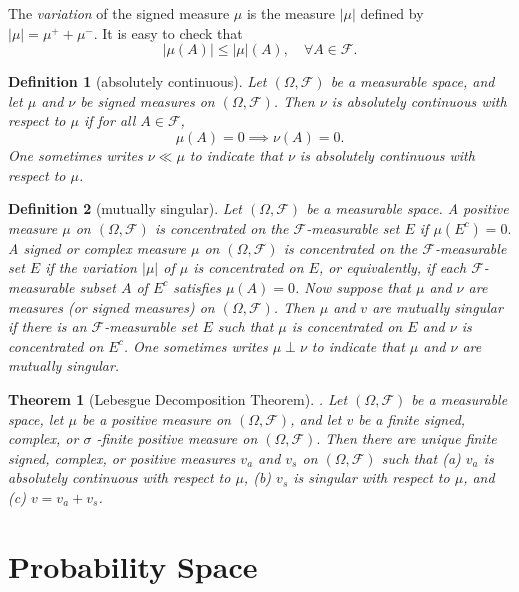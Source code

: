 \documentclass{report}
\newtheorem{definition}{Definition}[section]
\newtheorem{theorem}{Theorem}[section]
\theoremstyle{nonumberplain}
\begin{document}
The \emph{variation} of the signed measure $\mu$ is the measure $|\mu|$ defined by $|\mu|=\mu^{+}+\mu^{-}$. It is easy to check that
\[
|\mu(A)| \leq|\mu|(A),\quad\forall A\in\mathcal{F}.
\]

\begin{definition}[absolutely continuous]
Let $(\Omega, \mathcal{F})$ be a measurable space, and let $\mu$ and $\nu$ be signed measures on $(\Omega, \mathcal{F})$. Then $\nu$ is \emph{absolutely continuous} with respect to $\mu$ if for all $A\in\mathcal{F}$,
\[
\mu(A)=0\implies \nu(A)=0.
\]
One sometimes writes $\nu \ll \mu$ to indicate that $\nu$ is absolutely continuous with respect to $\mu$.
\end{definition}

\begin{definition}[mutually singular]
Let $(\Omega, \mathcal{F})$ be a measurable space. A positive measure $\mu$ on $(\Omega, \mathcal{F})$ is concentrated on the $\mathcal{F}$-measurable set $E$ if $\mu\left(E^{c}\right)=0 .$ A signed or complex measure $\mu$ on $(\Omega, \mathcal{F})$ is concentrated on the $\mathcal{F}$-measurable set $E$ if the variation $|\mu|$ of $\mu$ is concentrated on $E$, or equivalently, if each $\mathcal{F}$-measurable subset $A$ of $E^{c}$ satisfies $\mu(A)=0$. Now suppose that $\mu$ and $\nu$ are measures (or signed measures) on $(\Omega, \mathcal{F})$. Then $\mu$ and $v$ are \emph{mutually singular} if there is an $\mathcal{F}$-measurable set $E$ such that $\mu$ is concentrated on $E$ and $\nu$ is concentrated on $E^{c}$. One sometimes writes $\mu \perp \nu$ to indicate that $\mu$ and $\nu$ are mutually singular.
\end{definition}

\begin{theorem}[Lebesgue Decomposition Theorem]. Let $(\Omega, \mathcal{F})$ be a measurable space, let $\mu$ be a positive measure on $(\Omega, \mathcal{F})$, and let $v$ be a finite signed, complex, or $\sigma$ -finite positive measure on $(\Omega, \mathcal{F}) .$ Then there are unique finite signed, complex, or positive measures $v_{a}$ and $v_{s}$ on $(\Omega, \mathcal{F})$ such that
(a) $v_{a}$ is absolutely continuous with respect to $\mu$,
(b) $v_{s}$ is singular with respect to $\mu$, and
(c) $v=v_{a}+v_{s}$.
\end{theorem}

\chapter{Probability Space}
\end{document}
